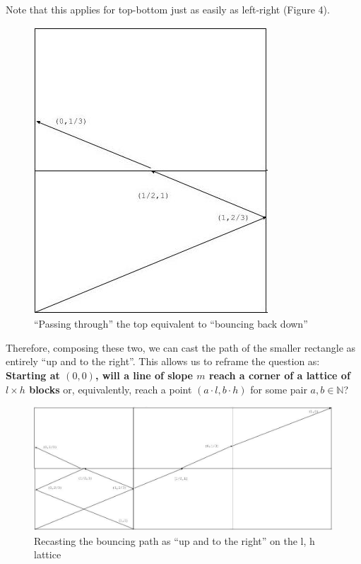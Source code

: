 \documentclass[11pt, oneside]{article} 	%
\begin{document}
Note that this applies for top-bottom just as easily as left-right (Figure 4).  

\begin{figure}[!htb]
\centering
\includegraphics[scale=.5]{mirrorup}
 \caption{``Passing through'' the top equivalent to ``bouncing back down''}
\end{figure}

Therefore, composing these two, we can cast the path of the smaller rectangle as entirely ``up and to the right''.  This allows us to reframe the question as: \textbf{Starting at $(0,0)$, will a line of slope $m$ reach a corner of a lattice of $l \times h$ blocks} or, equivalently, reach a point $(a \cdot l, b \cdot h)$ for some pair $a,b \in \mathbb{N}$?

\begin{figure}[!htb]
\centering
\includegraphics[scale=.4]{fullpath}
 \caption{Recasting the bouncing path as ``up and to the right'' on the l, h lattice}
\end{figure}
\end{document}
